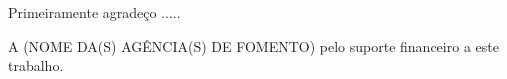 \begin{agradecimentos}
\noindent Primeiramente agradeço .....

\noindent A (NOME DA(S) AGÊNCIA(S) DE FOMENTO) pelo suporte financeiro a este trabalho.
\end{agradecimentos}
